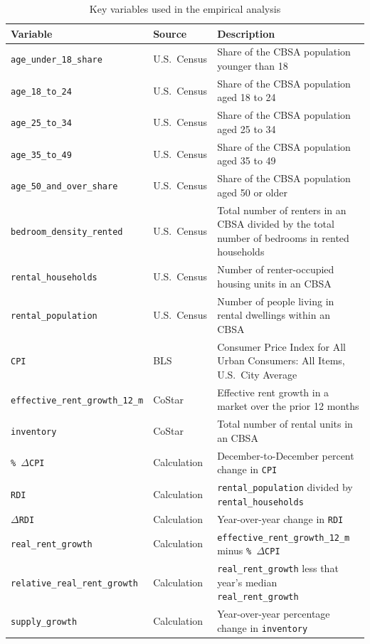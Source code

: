 \documentclass[pdflatex,sn-basic]{sn-jnl}%
\theoremstyle{thmstyleone}%
\theoremstyle{thmstyletwo}%
\theoremstyle{thmstylethree}%
\begin{document}
\setlength{\tabcolsep}{4pt} %
\begin{table}[htbp]	\centering
	\caption{Key variables used in the empirical analysis}
	\label{tab:variables}
	\begin{tabularx}{\textwidth}{@{}l l X@{}}
		\toprule
		\textbf{Variable} & \textbf{Source} & \textbf{Description} \\
		\midrule
		\texttt{age\_under\_18\_share} & U.S.\ Census & Share of the CBSA population younger than 18 \\
		\texttt{age\_18\_to\_24} & U.S.\ Census & Share of the CBSA population aged 18 to 24 \\
		\texttt{age\_25\_to\_34} & U.S.\ Census & Share of the CBSA population aged 25 to 34 \\
		\texttt{age\_35\_to\_49} & U.S.\ Census & Share of the CBSA population aged 35 to 49 \\
		\texttt{age\_50\_and\_over\_share} & U.S.\ Census & Share of the CBSA population aged 50 or older \\
		\texttt{bedroom\_density\_rented} & U.S.\ Census & Total number of renters in an CBSA divided by the total number of bedrooms in rented households \\
		\texttt{rental\_households} & U.S.\ Census & Number of renter-occupied housing units in an CBSA \\
		\texttt{rental\_population} & U.S.\ Census & Number of people living in rental dwellings within an CBSA \\
		\texttt{CPI} & BLS & Consumer Price Index for All Urban Consumers: All Items, U.S.\ City Average \\
		\texttt{effective\_rent\_growth\_12\_m} & CoStar & Effective rent growth in a market over the prior 12 months \\
		\texttt{inventory} & CoStar & Total number of rental units in an CBSA \\
		\texttt{\%\,$\Delta$CPI} & Calculation & December-to-December percent change in \texttt{CPI} \\
		\texttt{RDI} & Calculation & \texttt{rental\_population} divided by \texttt{rental\_households} \\
		\texttt{$\Delta$RDI} & Calculation & Year-over-year change in \texttt{RDI} \\
		\texttt{real\_rent\_growth} & Calculation & \texttt{effective\_rent\_growth\_12\_m} minus \texttt{\%\,$\Delta$CPI} \\
		\texttt{relative\_real\_rent\_growth} & Calculation & \texttt{real\_rent\_growth} less that year’s median \texttt{real\_rent\_growth} \\
		\texttt{supply\_growth} & Calculation & Year-over-year percentage change in \texttt{inventory} \\
		\bottomrule
	\end{tabularx}
\end{table}
\end{document}
